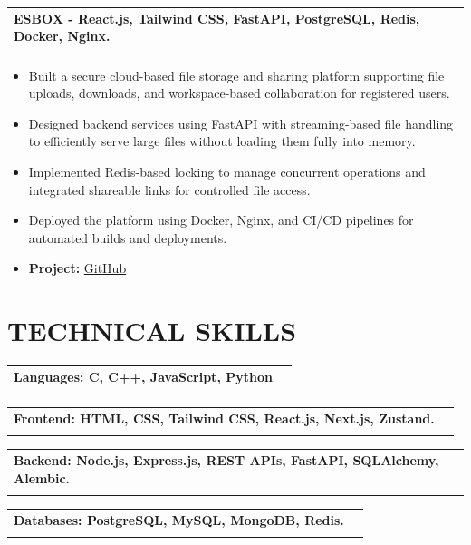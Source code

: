 \documentclass[10pt, a4paper]{article}
\makeatletter
\newcommand{\resumeSubheading}[4]{%
  \vspace{0.6mm}%
  \begin{tabular*}{0.98\textwidth}[t]{l@{\extracolsep{\fill}}r}%
      \textbf{#1} & \footnotesize{#4} \\%
    \footnotesize{#3} & \fontsize{9}{10}\selectfont#2%
  \end{tabular*}%
  \vspace{-2.4mm}%
}
\makeatother
\begin{document}
\vspace{-2.0mm}

\resumeSubheading
{ESBOX \fontsize{9}{9}\selectfont\fontseries{l}\selectfont - React.js, Tailwind CSS, FastAPI, PostgreSQL, Redis, Docker, Nginx.}{} {}{}
\vspace{-4.2mm}

\begin{itemize}[itemsep=-4pt]
  \item Built a secure cloud-based file storage and sharing platform supporting file uploads, downloads, and workspace-based collaboration for registered users.
  \item Designed backend services using FastAPI with streaming-based file handling to efficiently serve large files without loading them fully into memory.
  \item Implemented Redis-based locking to manage concurrent operations and integrated shareable links for controlled file access.
  \item Deployed the platform using Docker, Nginx, and CI/CD pipelines for automated builds and deployments.
  \item \textbf{Project: } \href{https://github.com/karthikeyakallapu/esbox}{GitHub}
\end{itemize}

\vspace{-3.5mm}
\section{\textbf{TECHNICAL SKILLS}}

\resumeSubheading
{Languages: \fontsize{11.5}{11.5}\selectfont\fontseries{l}\selectfont C, C++, JavaScript, Python}{}{}{}
\vspace{-5.15mm}

\resumeSubheading
{Frontend: \fontsize{11.5}{11.5}\selectfont\fontseries{l}\selectfont HTML, CSS, Tailwind CSS, React.js, Next.js, Zustand.}{}{}{}
\vspace{-5.15mm}

\resumeSubheading
{Backend: \fontsize{11.5}{11.5}\selectfont\fontseries{l}\selectfont Node.js, Express.js, REST APIs, FastAPI, SQLAlchemy, Alembic.}{}{}{}
\vspace{-5.15mm}

\resumeSubheading
{Databases: \fontsize{11.5}{11.5}\selectfont\fontseries{l}\selectfont PostgreSQL, MySQL, MongoDB, Redis.}{}{}{}
\vspace{-5.15mm}
\end{document}
